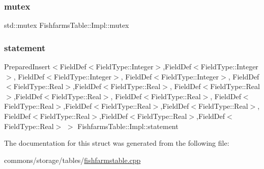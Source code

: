\mbox{\label{struct_fishfarms_table_1_1_impl_a52754885f0fe135eb3f741b74d196853}} 
\subsubsection{\texorpdfstring{mutex}{mutex}}
{\footnotesize\ttfamily std\+::mutex Fishfarms\+Table\+::\+Impl\+::mutex}

\mbox{\label{struct_fishfarms_table_1_1_impl_afcbce81ec87987fe666c00f18f5c1ae7}} 
\subsubsection{\texorpdfstring{statement}{statement}}
{\footnotesize\ttfamily Prepared\+Insert$<$Field\+Def$<$Field\+Type\+::\+Integer$>$,Field\+Def$<$Field\+Type\+::\+Integer$>$, Field\+Def$<$Field\+Type\+::\+Integer$>$, Field\+Def$<$Field\+Type\+::\+Integer$>$, Field\+Def$<$Field\+Type\+::\+Real$>$,Field\+Def$<$Field\+Type\+::\+Real$>$, Field\+Def$<$Field\+Type\+::\+Real$>$,Field\+Def$<$Field\+Type\+::\+Real$>$, Field\+Def$<$Field\+Type\+::\+Real$>$, Field\+Def$<$Field\+Type\+::\+Real$>$,Field\+Def$<$Field\+Type\+::\+Real$>$,Field\+Def$<$Field\+Type\+::\+Real$>$, Field\+Def$<$Field\+Type\+::\+Real$>$,Field\+Def$<$Field\+Type\+::\+Real$>$,Field\+Def$<$Field\+Type\+::\+Real$>$ $>$ Fishfarms\+Table\+::\+Impl\+::statement}



The documentation for this struct was generated from the following file\+:\begin{DoxyCompactItemize}
\item 
commons/storage/tables/\mbox{\hyperlink{fishfarmstable_8cpp}{fishfarmstable.\+cpp}}\end{DoxyCompactItemize}
